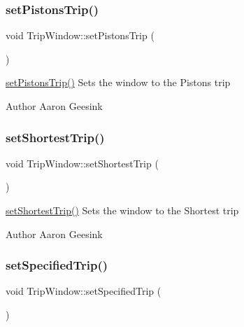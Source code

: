 \subsubsection{\texorpdfstring{setPistonsTrip()}{setPistonsTrip()}}
{\footnotesize\ttfamily void Trip\+Window\+::set\+Pistons\+Trip (\begin{DoxyParamCaption}{ }\end{DoxyParamCaption})}



\mbox{\hyperlink{class_trip_window_a2ee37fbce38c78242d3ad8acecd42491}{set\+Pistons\+Trip()}} Sets the window to the Pistons trip 

\begin{DoxyAuthor}{Author}
Aaron Geesink 
\end{DoxyAuthor}
\mbox{\label{class_trip_window_a15e3c7981197598f0a54feb03a31b023}} 
\subsubsection{\texorpdfstring{setShortestTrip()}{setShortestTrip()}}
{\footnotesize\ttfamily void Trip\+Window\+::set\+Shortest\+Trip (\begin{DoxyParamCaption}{ }\end{DoxyParamCaption})}



\mbox{\hyperlink{class_trip_window_a15e3c7981197598f0a54feb03a31b023}{set\+Shortest\+Trip()}} Sets the window to the Shortest trip 

\begin{DoxyAuthor}{Author}
Aaron Geesink 
\end{DoxyAuthor}
\mbox{\label{class_trip_window_a218b804ec1d07721d0b5b69aeacfdc25}} 
\subsubsection{\texorpdfstring{setSpecifiedTrip()}{setSpecifiedTrip()}}
{\footnotesize\ttfamily void Trip\+Window\+::set\+Specified\+Trip (\begin{DoxyParamCaption}{ }\end{DoxyParamCaption})}



